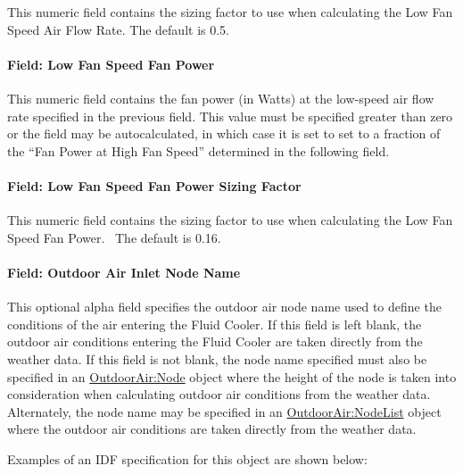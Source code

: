This numeric field contains the sizing factor to use when calculating the Low Fan Speed Air Flow Rate. The default is 0.5.

\paragraph{Field: Low Fan Speed Fan Power}\label{field-low-fan-speed-fan-power-2}

This numeric field contains the fan power (in Watts) at the low-speed air flow rate specified in the previous field. This value must be specified greater than zero or the field may be autocalculated, in which case it is set to set to a fraction of the ``Fan Power at High Fan Speed'' determined in the following field.

\paragraph{Field: Low Fan Speed Fan Power Sizing Factor}\label{field-low-fan-speed-fan-power-sizing-factor-2}

This numeric field contains the sizing factor to use when calculating the Low Fan Speed Fan Power.~ The default is 0.16.

\paragraph{Field: Outdoor Air Inlet Node Name}\label{field-outdoor-air-inlet-node-name-7}

This optional alpha field specifies the outdoor air node name used to define the conditions of the air entering the Fluid Cooler. If this field is left blank, the outdoor air conditions entering the Fluid Cooler are taken directly from the weather data. If this field is not blank, the node name specified must also be specified in an \hyperref[outdoorairnode]{OutdoorAir:Node} object where the height of the node is taken into consideration when calculating outdoor air conditions from the weather data. Alternately, the node name may be specified in an \hyperref[outdoorairnodelist]{OutdoorAir:NodeList} object where the outdoor air conditions are taken directly from the weather data.

Examples of an IDF specification for this object are shown below:

